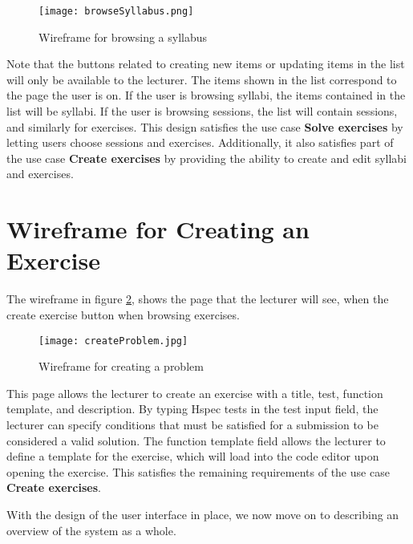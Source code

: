\begin{figure}[H]
    \texttt{[image: browseSyllabus.png]}
    \centering
    \caption{Wireframe for browsing a syllabus}
    \label{fig:wfSyllabus}
\end{figure}
Note that the buttons related to creating new items or updating items in the list will only be available to the lecturer. The items shown in the list correspond to the page the user is on. If the user is browsing syllabi, the items contained in the list will be syllabi. If the user is browsing sessions, the list will contain sessions, and similarly for exercises. This design satisfies the use case \textbf{Solve exercises} by letting users choose sessions and exercises. Additionally, it also satisfies part of the use case \textbf{Create exercises} by providing the ability to create and edit syllabi and exercises.

\section{Wireframe for Creating an Exercise}
The wireframe in figure \ref{fig:wfProblem}, shows the page that the lecturer will see, when the create exercise button when browsing exercises.
\begin{figure}[H]
	\texttt{[image: createProblem.jpg]}
	\centering
	\caption{Wireframe for creating a problem}
	\label{fig:wfProblem}
\end{figure}

This page allows the lecturer to create an exercise with a title, test, function template, and description.
By typing Hspec tests in the test input field, the lecturer can specify conditions that must be satisfied for a submission to be considered a valid solution.
The function template field allows the lecturer to define a template for the exercise, which will load into the code editor upon opening the exercise.
This satisfies the remaining requirements of the use case \textbf{Create exercises}.

With the design of the user interface in place, we now move on to describing an overview of the system as a whole.
